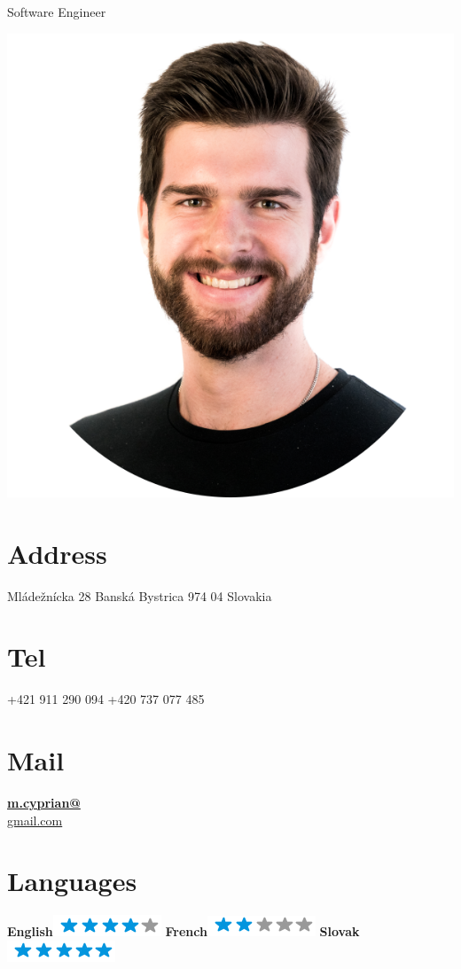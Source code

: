 \documentclass[]{friggeri-cv}
\begin{document}
      {Software Engineer}
      

\begin{aside}
  \includegraphics[scale=0.18]{img/mcyprian.png}
  \section{Address}
    Mládežnícka 28
    Banská Bystrica
    974 04
    Slovakia
    ~
  \section{Tel}
    +421 911 290 094
    +420 737 077 485
    ~
  \section{Mail}
    \href{mailto:m.cyprian@gmail.com}{\textbf{m.cyprian@}\\gmail.com}
    ~
  \section{Languages}
    \textbf{English}\includegraphics[scale=0.40]{img/4stars.png}
    \textbf{French}\includegraphics[scale=0.40]{img/2stars.png}
    \textbf{Slovak}\includegraphics[scale=0.40]{img/5stars.png}
    ~

\end{aside}
\end{document}
